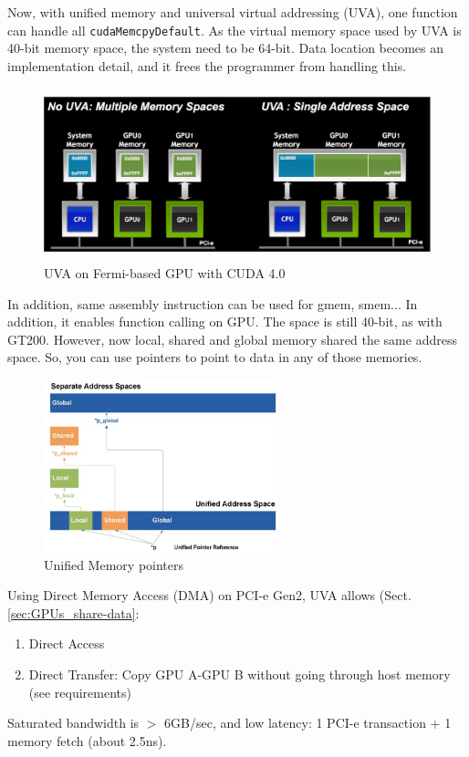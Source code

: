 Now, with unified memory and universal virtual addressing (UVA), one function
can handle all \verb!cudaMemcpyDefault!. As the virtual memory space used by UVA
is 40-bit memory space, the system need to be 64-bit. Data location becomes an
implementation detail, and it frees the programmer from handling this.

\begin{figure}[hbt]
  \centerline{\includegraphics[height=5cm,
    angle=0]{./images/UVA_CUDA4.eps}}
\caption{UVA on Fermi-based GPU with CUDA 4.0}
\label{fig:fermi_UVA}
\end{figure}

In addition, same assembly instruction can be used for gmem,
smem... In addition, it enables function calling on GPU. %
The space is still 40-bit, as with GT200. However, now local, shared
and global memory shared the same address space. So, you can use
pointers to point to data in any of those memories. 

\begin{figure}[hbt]
  \centerline{\includegraphics[height=5cm,
    angle=0]{./images/unified_memory.eps}}
\caption{Unified Memory pointers}
\label{fig:unified_memory}
\end{figure}

Using Direct Memory Access (DMA) on PCI-e Gen2, UVA allows
(Sect.\ref{sec:GPUs_share-data}:
\begin{enumerate}
  \item Direct Access
  \item Direct Transfer: Copy GPU A-GPU B without going through host memory
  (see requirements)
\end{enumerate}
Saturated bandwidth is $>$ 6GB/sec, and low latency: 1 PCI-e transaction + 1
memory fetch (about 2.5ns).

